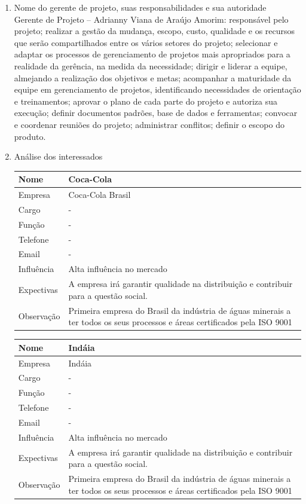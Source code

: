 \begin{enumerate}
\item Nome do gerente de projeto, suas responsabilidades e sua autoridade\\
Gerente de Projeto – Adrianny Viana de Araújo Amorim: responsável pelo projeto; realizar a gestão da mudança, escopo, custo, qualidade e os recursos que serão compartilhados entre os vários setores do projeto; selecionar e adaptar os processos de gerenciamento de projetos mais apropriados para a realidade da gerência, na medida da necessidade; dirigir e liderar a equipe, almejando a realização dos objetivos e metas; acompanhar a maturidade da equipe em gerenciamento de projetos, identificando necessidades de orientação e treinamentos; aprovar o plano de cada parte do projeto e autoriza sua execução; definir documentos padrões, base de dados e ferramentas; convocar e coordenar reuniões do projeto; administrar conflitos; definir o escopo do produto.

\item Análise dos interessados
\begin{table}[!h]
\centering
\begin{tabular}{|p{5cm}|p{10cm}|}\hline
Nome & Coca-Cola\\
\hline                               
Empresa & Coca-Cola Brasil \\ \hline 
Cargo & - \\ \hline 
Função & - \\ \hline 
Telefone & - \\ \hline 
Email & - \\ \hline 
Influência & Alta influência no mercado \\ \hline 
Expectivas & A empresa irá garantir qualidade na distribuição e contribuir para a questão social.\\ \hline 
Observação & Primeira empresa do Brasil da indústria de águas minerais a ter todos os seus processos e áreas certificados pela ISO 9001 \\ \hline 

\end{tabular}
\end{table}
\FloatBarrier

\begin{table}[!h]
\centering
\begin{tabular}{|p{5cm}|p{10cm}|}\hline
Nome & Indáia\\
\hline                               
Empresa & Indáia\\ \hline 
Cargo & - \\ \hline 
Função & - \\ \hline 
Telefone & - \\ \hline 
Email & - \\ \hline 
Influência & Alta influência no mercado \\ \hline 
Expectivas & A empresa irá garantir qualidade na distribuição e contribuir para a questão social.\\ \hline 
Observação & Primeira empresa do Brasil da indústria de águas minerais a ter todos os seus processos e áreas certificados pela ISO 9001 \\ \hline 


\end{tabular}
\end{table}
\end{enumerate}
